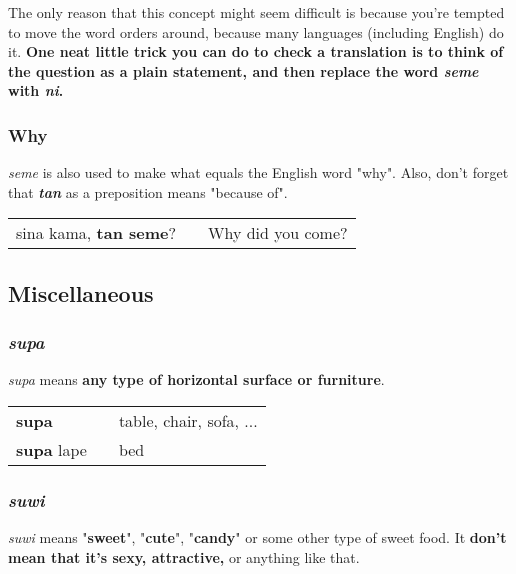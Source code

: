 The only reason that this concept might seem difficult is because you're tempted to move the word orders around, because many languages (including English) do it. 
\textbf{One neat little trick you can do to check a translation is to think of the question as a plain statement, and then replace the word \textit{seme} with \textit{ni}.} 
%
{}
\subsubsection*{Why}
%
\textit{seme} is also used to make what equals the English word "why". 
Also, don't forget that \textbf{\textit{tan}} as a preposition means "because of".

\begin{supertabular}{p{5,5cm}|ll}
sina kama, \textbf{tan seme}? && Why did you come? \\
\end{supertabular} 

%
\subsection*{Miscellaneous}
%
\subsubsection*{\textit{supa}}
%
\textit{supa} means \textbf{any type of horizontal surface or furniture}. 

\begin{supertabular}{p{5,5cm}|ll}
\textbf{supa}  && table, chair, sofa, ...  \\
\textbf{supa} lape &&  bed \\
\end{supertabular} 
%
\subsubsection*{\textit{suwi}}
%
\textit{suwi} means "\textbf{sweet}", "\textbf{cute}", "\textbf{candy}" or some other type of sweet food. 
It \textbf{don't mean that it's sexy, attractive,} or anything like that. 

